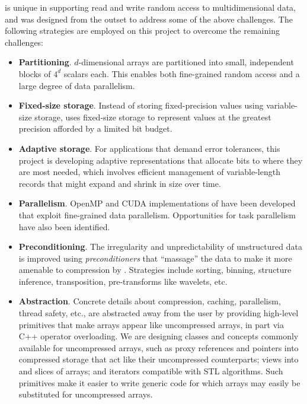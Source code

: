 {\zfp} is unique in supporting read and write random access to
multidimensional data, and was designed from the outset to address
some of the above challenges.  The following strategies are employed on
this project to overcome the remaining challenges:
%
\begin{itemize}
\item \textbf{Partitioning}.  $d$-dimensional arrays are partitioned
into small, independent blocks of $4^d$ scalars each.  This enables both
fine-grained random access and a large degree of data parallelism.

\item \textbf{Fixed-size storage}.  Instead of storing fixed-precision
values using variable-size storage, {\zfp} uses fixed-size storage to
represent values at the greatest precision afforded by a limited
bit budget.

\item \textbf{Adaptive storage}.  For applications that demand error
tolerances, this project is developing adaptive representations that
allocate bits to where they are most needed, which involves efficient
management of variable-length records that might expand and shrink in
size over time.

\item \textbf{Parallelism}.  OpenMP and CUDA implementations of {\zfp}
have been developed that exploit fine-grained data parallelism.
Opportunities for task parallelism have also been identified.

\item \textbf{Preconditioning}.  The irregularity and unpredictability
of unstructured data is improved using \emph{preconditioners} that
``massage'' the data to make it more amenable to compression by {\zfp}.
Strategies include sorting, binning, structure inference, transposition,
pre-transforms like wavelets, etc.

\item \textbf{Abstraction}.  Concrete details about compression, caching,
parallelism, thread safety, etc., are abstracted away from the user by
providing high-level primitives that make {\zfp} arrays appear like
uncompressed arrays, in part via C++ operator overloading.  We are
designing classes and concepts commonly available for uncompressed arrays,
such as proxy references and pointers into compressed storage that act
like their uncompressed counterparts; views into and slices of arrays;
and iterators compatible with STL algorithms.  Such primitives make it
easier to write generic code for which {\zfp} arrays may easily be
substituted for uncompressed arrays.
\end{itemize}

